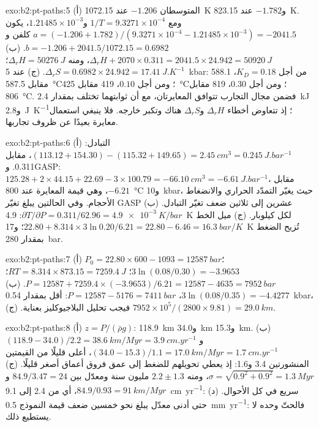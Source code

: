 \begin{solution}{exo:b2:pt-paths:5}
(أ) المتوسطان $-1.206$ عند \qty{1072.15}{K} و$-1.782$ عند \qty{823.15}{K}. ومع $1/T =
9.3271\times10^{-4}$ و$1.21485\times10^{-3}$، يكون $a = (-1.206 + 1.782)/(9.3271\times10^{-4}
- 1.21485\times10^{-3}) = -2041.5$ كلفن و$b = -1.206 + 2041.5/1072.15 = 0.6982$.
(ب) $\Delta_r H + 2070\times0.311 = 2041.5\times24.942 = \qty{50920}{J}$، ومنه $\Delta_r H =
\qty{50276}{J}$؛ $\Delta_r S = 0.6982\times24.942 = \qty{17.41}{J.K^{-1}}$. (ج) عند
\qty{5}{kbar}: من أجل $K_D = 0.18$، 588.1 مقابل \qty{587.5}{\celsius}؛ ومن أجل $0.10$، 419
مقابل \qty{425}{\celsius}؛ ومن أجل $0.30$، 819 مقابل \qty{806}{\celsius}. فضمن مجال
التجارب تتوافق المعايرتان، مع أن ثوابتهما تختلف بمقدار
\qty{2.4}{kJ} و\qty{2.8}{J.K^{-1}}؛ إذ تتعاوض أخطاء $\Delta_r H$ و$\Delta_r S$
هناك وتكبر خارجه. فلا ينبغي استعمال معايرة بعيدًا
عن ظروف تجاربها.
\end{solution}

\begin{solution}{exo:b2:pt-paths:6}
(أ) التبادل: $(113.12 + 154.30) - (115.32 + 149.65) = \qty{+2.45}{cm^3} =
\qty{0.245}{J.bar^{-1}}$، مقابل 0.311. وGASP: $125.28 + 2\times44.15 + 22.69 -
3\times100.79 = \qty{-66.10}{cm^3} = \qty{-6.61}{J.bar^{-1}}$، مقابل $-6.21$، وهي قيمة
المعايرة عند \qty{800}{\celsius} و\qty{10}{kbar}، حيث يغيّر التمدّد الحراري
والانضغاط الأحجام. وفي الحالتين يبلغ تغيّر GASP عشرين إلى ثلاثين ضعف
تغيّر التبادل. (ب) $\partial T/\partial P = 0.311/62.96 = \qty{4.9e-3}{K/bar}$:
\qty{4.9}{K} لكل كيلوبار. (ج) ميل الخط $22.80 + 8.314\times3\ln 0.20/6.21
= 22.80 - 6.46 = \qty{16.3}{bar/K}$؛ و\qty{17}{K} تُزيح الضغط بمقدار
\qty{280}{bar}.
\end{solution}

\begin{solution}{exo:b2:pt-paths:7}
(أ) $P_0 = 22.80\times600 - 1093 = \qty{12587}{bar}$؛ $3\ln(0.08/0.30) = -3.9653$؛ $RT =
8.314\times873.15 = \qty{7259.4}{J}$؛ $P = 12587 + 7259.4\times(-3.9653)/6.21 = 12587 -
4635 = \qty{7952}{bar}$. (ب) $3\ln(0.08/0.35) = -4.4277$، $P = 12587 - 5176 =
\qty{7411}{bar}$: أقل بمقدار \qty{0.54}{kbar}، فيجب تحليل البلاجيوكليز بعناية.
(ج) $7952\times10^5/(2800\times9.81) = \qty{29.0}{km}$.
\end{solution}

\begin{solution}{exo:b2:pt-paths:8}
(أ) $z = P/(\bar\rho g)$: \qty{118.9}{km} و\qty{34.0}{km} و\qty{15.3}{km}.
(ب) $(118.9 - 34.0)/2.2 = \qty{38.6}{km/Myr} = \qty{3.9}{cm.yr^{-1}}$ و$(34.0 -
15.3)/1.1 = \qty{17.0}{km/Myr} = \qty{1.7}{cm.yr^{-1}}$، أعلى قليلًا من القيمتين المنشورتين
3.4 و1.6: إذ يعطي تحويلهم للضغط إلى عمق فروق أعماق
أصغر قليلًا. (ج) $\sigma = \sqrt{0.9^2 + 0.9^2} = \qty{1.3}{Myr}$، ومنه $2.2 \pm 1.3$
مليون سنة ومعدّل بين $84.9/3.47 = 24$ و$84.9/0.93 = \qty{91}{km/Myr}$،
أي من 2.4 إلى \qty{9.1}{cm.yr^{-1}}: سريع في كل الأحوال. (د) حتى أدنى معدّل يبلغ نحو خمسين ضعف
قيمة النموذج \qty{0.5}{mm.yr^{-1}}: فالحتّ وحده لا يستطيع ذلك.
\end{solution}

